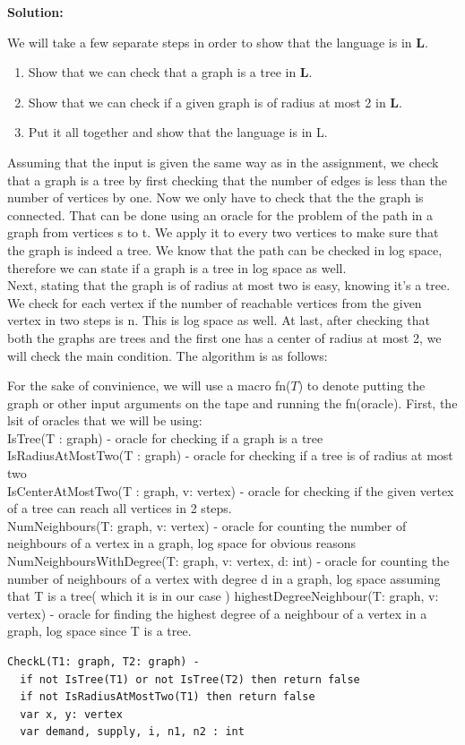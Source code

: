 \documentclass[12pt]{article}
\newenvironment{solution}{\noindent\textbf{Solution:} \par\vspace{10pt}}{\par\vspace{10pt}}
\begin{document}
\begin{solution}
  We will take a few separate steps in order to show that the language is in $\mathbf{L}$.
  \begin{enumerate}
    \item Show that we can check that a graph is a tree in $\mathbf{L}$.
    \item Show that we can check if a given graph is of radius at most 2 in $\mathbf{L}$.
    \item Put it all together and show that the language is in L. 
  \end{enumerate}
  Assuming that the input is given the same way as in the assignment, we check that a graph is a tree by first checking that the number of edges is less than the number of vertices by one. Now we only have to check that the  the graph is connected. That can be done using an oracle for the problem of the path in a graph from vertices s to t. We apply it to every two vertices to make sure that the graph is indeed a tree. We know that the path can be checked in log space, therefore we can state if a graph is a tree in log space as well. \\

  Next, stating that the graph is of radius at most two is easy, knowing  it's a tree. We check for each vertex if the number of reachable vertices from the given vertex in two steps is n. This is log space as well.
  At last, after checking that both the graphs are trees and the first one has a center of radius at most 2, we will check the main condition. The algorithm is as follows: 

For the sake of convinience, we will use a macro  fn($T$) to denote putting the graph or other input arguments on the tape and running the fn(oracle). 
First, the lsit of oracles that we will be using: 
\\IsTree(T : graph) - oracle for checking if a graph is a tree
\\IsRadiusAtMostTwo(T : graph) - oracle for checking if a tree is of radius at most two
\\IsCenterAtMostTwo(T : graph, v: vertex) - oracle for checking if the given vertex of a tree can reach all vertices in 2 steps. 
\\NumNeighbours(T: graph, v: vertex) - oracle for counting the number of neighbours of a vertex in a graph, log space for obvious reasons 
\\NumNeighboursWithDegree(T: graph, v: vertex, d: int) - oracle for counting the number of neighbours of a vertex with degree d in a graph, log space assuming that T is a tree( which it is in our case )
highestDegreeNeighbour(T: graph, v: vertex) - oracle for finding the highest degree of a neighbour of a vertex in a graph, log space since T is a tree.
\newpage
\begin{lstlisting}
CheckL(T1: graph, T2: graph) - 
  if not IsTree(T1) or not IsTree(T2) then return false
  if not IsRadiusAtMostTwo(T1) then return false
  var x, y: vertex 
  var demand, supply, i, n1, n2 : int


\end{lstlisting}
\end{solution}
\end{document}
